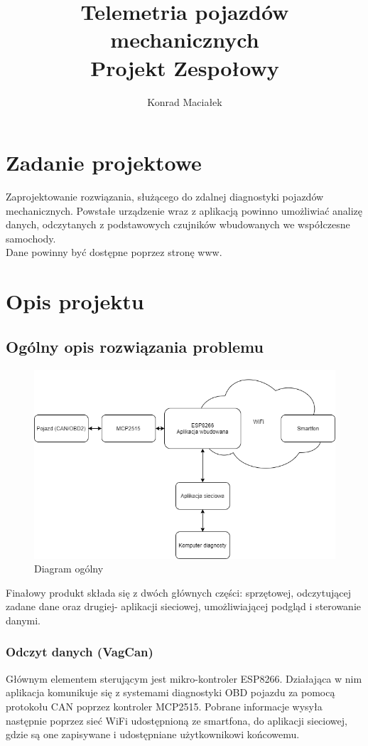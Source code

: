 \documentclass[10pt,a4paper]{article}
\author{Konrad Maciałek}
\title{Telemetria pojazdów mechanicznych\\
\large Projekt Zespołowy}
\begin{document}
	\maketitle
	\newpage
	\section{Zadanie projektowe}
	Zaprojektowanie rozwiązania, służącego do zdalnej diagnostyki pojazdów mechanicznych. Powstałe urządzenie wraz z aplikacją powinno umożliwiać analizę danych, odczytanych z podstawowych czujników wbudowanych we współczesne samochody.
	\\
	Dane powinny być dostępne poprzez stronę www.
	\section{Opis projektu}
		\subsection{Ogólny opis rozwiązania problemu}
		\begin{figure}[H]
			\centering
			\includegraphics[width=0.7\linewidth]{./remoteCarDiagz.drawio}
			\caption[Diagram ogólny]{Diagram ogólny}
			\label{fig:remotecardiagz}
		\end{figure}
		Finałowy produkt składa się z dwóch głównych części: sprzętowej, odczytującej zadane dane oraz drugiej- aplikacji sieciowej, umożliwiającej podgląd i sterowanie danymi. 
		\subsubsection{Odczyt danych (VagCan)}
		Głównym elementem sterującym jest mikro-kontroler ESP8266. Działająca w nim aplikacja komunikuje się z systemami diagnostyki OBD pojazdu za pomocą protokołu CAN poprzez kontroler MCP2515. Pobrane informacje wysyła następnie poprzez sieć WiFi udostępnioną ze smartfona, do aplikacji sieciowej, gdzie są one zapisywane i udostępniane użytkownikowi końcowemu. 
\end{document}

